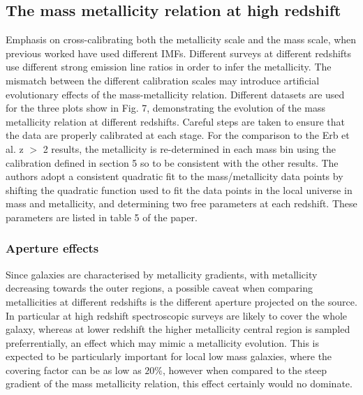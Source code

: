 \documentclass{literature}
\begin{document}
\subsection{The mass metallicity relation at high redshift}
Emphasis on cross-calibrating both the metallicity scale and the mass scale, when previous worked have used different IMFs. Different surveys at different redshifts use different strong emission line ratios in order to infer the metallicity. The mismatch between the different calibration scales may introduce artificial evolutionary effects of the mass-metallicity relation. Different datasets are used for the three plots show in Fig. 7, demonstrating the evolution of the mass metallicity relation at different redshifts. Careful steps are taken to ensure that the data are properly calibrated at each stage. For the comparison to the Erb et al. \citep{Erb_2006} z $>$ 2 results, the metallicity is re-determined in each mass bin using the calibration defined in section 5 so to be consistent with the other results. The authors adopt a consistent quadratic fit to the mass/metallicity data points by shifting the quadratic function used to fit the data points in the local universe in mass and metallicity, and determining two free parameters at each redshift. These parameters are listed in table 5 of the paper.
\subsubsection{Aperture effects}
Since galaxies are characterised by metallicity gradients, with metallicity decreasing towards the outer regions, a possible caveat when comparing metallicities at different redshifts is the different aperture projected on the source. In particular at high redshift spectroscopic surveys are likely to cover the whole galaxy, whereas at lower redshift the higher metallicity central region is sampled preferrentially, an effect which may mimic a metallicity evolution. This is expected to be particularly important for local low mass galaxies, where the covering factor can be as low as $20\%$, however when compared to the steep gradient of the mass metallicity relation, this effect certainly would no dominate.
\end{document}
